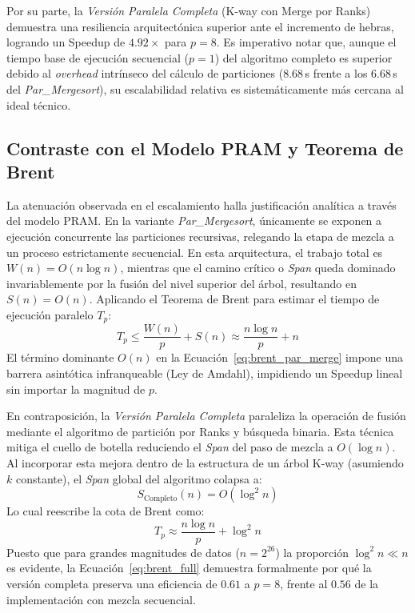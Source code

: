 \documentclass[12pt, a4paper]{article}
\begin{document}
Por su parte, la \textit{Versión Paralela Completa} (K-way con Merge por Ranks) demuestra una resiliencia arquitectónica superior ante el incremento de hebras, 
logrando un Speedup de $4.92\times$ para $p=8$. Es imperativo notar que, aunque el tiempo base de ejecución secuencial ($p=1$) del algoritmo completo es superior debido al 
\textit{overhead} intrínseco del cálculo de particiones ($8.68$\,s frente a los $6.68$\,s del \textit{Par\_Mergesort}), su escalabilidad relativa es sistemáticamente más cercana al ideal técnico.

\subsection{Contraste con el Modelo PRAM y Teorema de Brent}
La atenuación observada en el escalamiento halla justificación analítica a través del modelo PRAM. 
En la variante \textit{Par\_Mergesort}, únicamente se exponen a ejecución concurrente las particiones recursivas, relegando la etapa de mezcla a un proceso estrictamente secuencial. En esta arquitectura, el trabajo total es $W(n) = O(n \log n)$, mientras que el camino crítico o 
\textit{Span} queda dominado invariablemente por la fusión del nivel superior del árbol, resultando en $S(n) = O(n)$. 
Aplicando el Teorema de Brent para estimar el tiempo de ejecución paralelo $T_p$:
\begin{equation}
    T_p \leq \frac{W(n)}{p} + S(n) \approx \frac{n \log n}{p} + n
    \label{eq:brent_par_merge}
\end{equation}
El término dominante $O(n)$ en la Ecuación~\ref{eq:brent_par_merge} impone una barrera asintótica infranqueable (Ley de Amdahl), impidiendo un Speedup lineal sin importar la magnitud de $p$.

En contraposición, la \textit{Versión Paralela Completa} paraleliza la operación de fusión mediante el algoritmo de partición por Ranks y búsqueda binaria. Esta técnica mitiga el cuello de botella reduciendo el \textit{Span} del paso de mezcla a $O(\log n)$. 
Al incorporar esta mejora dentro de la estructura de un árbol K-way (asumiendo $k$ constante), el \textit{Span} global del algoritmo colapsa a:
\begin{equation}
    S_{\text{Completo}}(n) = O(\log^2 n)
\end{equation}
Lo cual reescribe la cota de Brent como:
\begin{equation}
    T_p \approx \frac{n \log n}{p} + \log^2 n
    \label{eq:brent_full}
\end{equation}
Puesto que para grandes magnitudes de datos ($n=2^{26}$) la proporción $\log^2 n \ll n$ es evidente, la Ecuación~\ref{eq:brent_full} demuestra formalmente por qué la versión completa preserva una eficiencia de $0.61$ a $p=8$, frente al $0.56$ de la implementación con mezcla secuencial.
\end{document}
